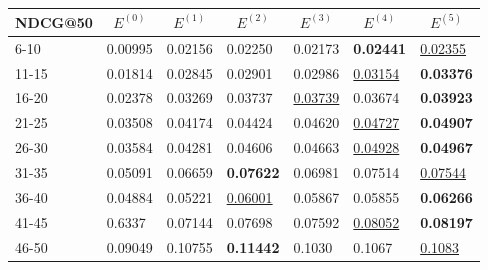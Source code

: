 \begin{table*}[]
    \begin{tabular}{|l|l|l|l|l|l|l|}
        \hline
        NDCG@50 & \multicolumn{1}{c|}{$E^{(0)}$} & \multicolumn{1}{c|}{$E^{(1)}$} & \multicolumn{1}{c|}{$E^{(2)}$} & \multicolumn{1}{c|}{$E^{(3)}$} & \multicolumn{1}{c|}{$E^{(4)}$} & \multicolumn{1}{c|}{$E^{(5)}$} \\ \hline
        6-10    & 0.00995                        & 0.02156                        & 0.02250                        & 0.02173                        & \textbf{0.02441}               & \underline{0.02355}            \\ \hline
        11-15   & 0.01814                        & 0.02845                        & 0.02901                        & 0.02986                        & \underline{0.03154}            & \textbf{0.03376}               \\ \hline
        16-20   & 0.02378                        & 0.03269                        & 0.03737                        & \underline{0.03739}            & 0.03674                        & \textbf{0.03923}               \\ \hline
        21-25   & 0.03508                        & 0.04174                        & 0.04424                        & 0.04620                        & \underline{0.04727}            & \textbf{0.04907}               \\ \hline
        26-30   & 0.03584                        & 0.04281                        & 0.04606                        & 0.04663                        & \underline{0.04928}            & \textbf{0.04967}               \\ \hline
        31-35   & 0.05091                        & 0.06659                        & \textbf{0.07622}               & 0.06981                        & 0.07514                        & \underline{0.07544}            \\ \hline
        36-40   & 0.04884                        & 0.05221                        & \underline{0.06001}            & 0.05867                        & 0.05855                        & \textbf{0.06266}               \\ \hline
        41-45   & 0.6337                         & 0.07144                        & 0.07698                        & 0.07592                        & \underline{0.08052}            & \textbf{0.08197}               \\ \hline
        46-50   & 0.09049                        & 0.10755                        & \textbf{0.11442}               & 0.1030                         & 0.1067                         & \underline{0.1083}             \\ \hline

\end{tabular}
\end{table*}

